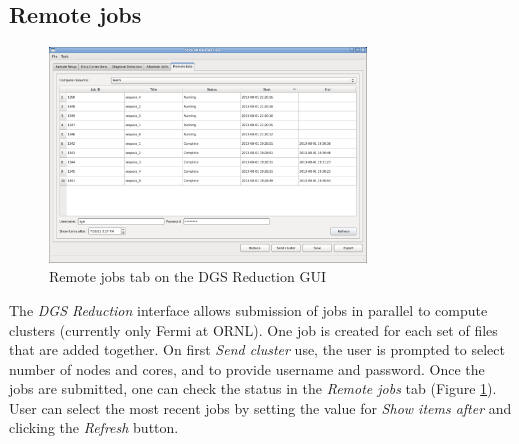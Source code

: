 \subsection{Remote jobs}

\begin{figure}[ht]
\centerline{\includegraphics[width=0.75\textwidth]{figures/cluster.png}}
\caption{Remote jobs tab on the DGS Reduction GUI}
\label{fig:cluster}
\end{figure}

The \textit{DGS Reduction} interface allows submission of jobs in parallel to compute clusters (currently only Fermi at ORNL). One job is created for each set of files that are added together. On first \textit{Send cluster} use, the user is prompted to select number of nodes and cores, and to provide username and password. Once the jobs are submitted, one can check the status in the \textit{Remote jobs} tab (Figure \ref{fig:cluster}). User can select the most recent jobs by setting the value for \textit{Show items after} and clicking the \textit{Refresh} button. 


